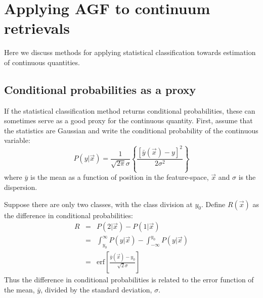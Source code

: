 

%

\section{Applying AGF to continuum retrievals}

Here we discuss methods for applying statistical classification towards
estimation of continuous quantities.

\subsection{Conditional probabilities as a proxy}

If the statistical classification method returns conditional probabilities,
these can sometimes serve as a good proxy for the continuous quantity.
First, assume that the statistics are Gaussian and write the conditional
probability of the continuous variable:
\begin{equation}
P(y|\vec x) = \frac{1}{\sqrt {2 \pi} \sigma} 
	\left \lbrace \frac{[\bar y(\vec x) - y]^2}{2 \sigma^2} \right \rbrace
\end{equation}
where $\bar y$ is the mean as a function of position in the feature-space,
$\vec x$ and $\sigma$ is the dispersion.

Suppose there are only two classes, with the class division at $y_0$.
Define $R(\vec x)$ as the difference in conditional probabilities:
\begin{eqnarray}
R & = & P(2 | \vec x) - P(1 | \vec x) \\
& = & \int_{y_0}^\infty P(y | \vec x) - \int_{-\infty}^{y_0} P(y|\vec x) \\
& = & \mathrm{erf} \left [ \frac{\bar y(\vec x) - y_0}{\sqrt 2 \sigma} \right ]
\end{eqnarray}
Thus the difference in conditional probabilities is related to the error
function of the mean, $\bar y$, divided by the standard deviation, $\sigma$.

